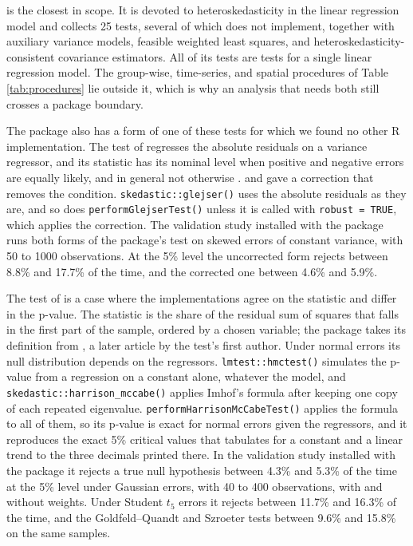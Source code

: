  is the closest in scope. It is devoted to
heteroskedasticity in the linear regression model and collects 25 tests,
several of which  does not implement, together with
auxiliary variance models, feasible weighted least squares, and
heteroskedasticity-consistent covariance estimators. All of its tests are
tests for a single linear regression model. The group-wise, time-series, and
spatial procedures of Table \ref{tab:procedures} lie outside it, which is why
an analysis that needs both still crosses a package boundary.

The package also has a form of one of these tests for which we found no other
R implementation. The test of \citet{glejser1969new} regresses the absolute
residuals on a variance regressor, and its statistic has its nominal level
when positive and negative errors are equally likely, and in general not
otherwise \citep{godfrey1996some}. \citet{im2000robustifying} and \citet{machado2000glejser} gave
a correction that removes the condition. \texttt{skedastic::glejser()} uses the
absolute residuals as they are, and so does \texttt{performGlejserTest()} unless it
is called with \texttt{robust\ =\ TRUE}, which applies the correction. The validation
study installed with the package runs both forms of the package's test on
skewed errors of constant variance, with 50 to
1000 observations. At the 5\% level the uncorrected form rejects
between 8.8\% and
17.7\% of the time, and the corrected one
between 4.6\% and
5.9\%.

The test of \citet{harrison1979test} is a case where the implementations agree on the
statistic and differ in the p-value. The statistic is the share of the
residual sum of squares that falls in the first part of the sample, ordered by
a chosen variable; the package takes its definition from
\citet{harrison1981comparison}, a later article by the test's first author. Under
normal errors its null distribution depends on the regressors.
\texttt{lmtest::hmctest()} simulates the p-value from a regression on a constant
alone, whatever the model, and \texttt{skedastic::harrison\_mccabe()} applies Imhof's
formula \citep{imhof1961computing} after keeping one copy of each repeated
eigenvalue. \texttt{performHarrisonMcCabeTest()} applies the formula to all of them,
so its p-value is exact for normal errors given the regressors, and it
reproduces the exact 5\% critical values that \citet{harrison1981comparison}
tabulates for a constant and a linear trend to the three decimals printed
there. In the validation study installed with the package it rejects a true null
hypothesis between 4.3\% and
5.3\% of the time at the 5\% level
under Gaussian errors, with 40 to 400 observations, with
and without weights. Under Student \(t_5\) errors it rejects between
11.7\% and
16.3\% of the time, and the
Goldfeld--Quandt and Szroeter tests between
9.6\% and
15.8\% on the same
samples.


